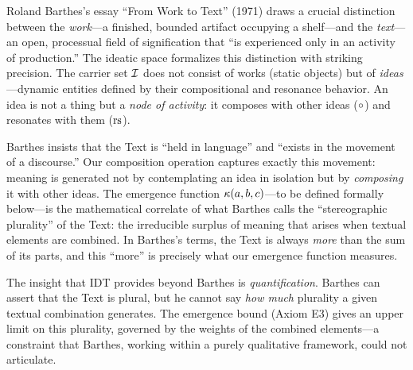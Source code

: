 \begin{interpretation}\label{interp:ch1:barthes_text}
Roland Barthes's essay ``From Work to Text'' (1971) draws a crucial
distinction between the \emph{work}---a finished, bounded artifact occupying
a shelf---and the \emph{text}---an open, processual field of signification
that ``is experienced only in an activity of production.'' The ideatic space
formalizes this distinction with striking precision. The carrier set $\mathcal{I}$
does not consist of works (static objects) but of \emph{ideas}---dynamic
entities defined by their compositional and resonance behavior. An idea is
not a thing but a \emph{node of activity}: it composes with other ideas
($\circ$) and resonates with them ($\mathrm{rs}$).

Barthes insists that the Text is ``held in language'' and ``exists in the
movement of a discourse.'' Our composition operation captures exactly this
movement: meaning is generated not by contemplating an idea in isolation
but by \emph{composing} it with other ideas. The emergence function
$\kappa(a, b, c)$---to be defined formally below---is the mathematical
correlate of what Barthes calls the ``stereographic plurality'' of the
Text: the irreducible surplus of meaning that arises when textual elements
are combined. In Barthes's terms, the Text is always \emph{more} than
the sum of its parts, and this ``more'' is precisely what our emergence
function measures.

The insight that IDT provides beyond Barthes is \emph{quantification}.
Barthes can assert that the Text is plural, but he cannot say \emph{how
much} plurality a given textual combination generates. The emergence
bound (Axiom E3) gives an upper limit on this plurality, governed by the
weights of the combined elements---a constraint that Barthes, working
within a purely qualitative framework, could not articulate.
\end{interpretation}

